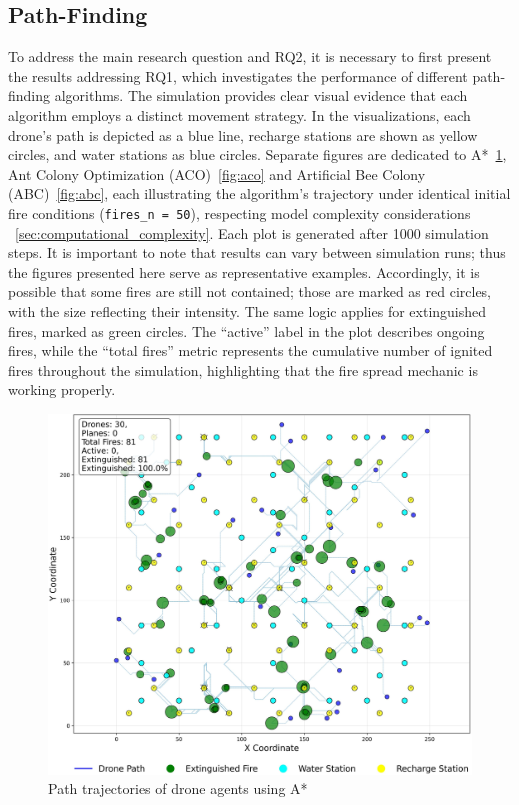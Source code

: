 \documentclass[11pt, a4paper]{article}
\begin{document}
\subsection{Path-Finding}
\label{sec:pathfindingRESULTS}
To address the main research question and RQ2, it is necessary to first present the results addressing RQ1, which investigates the performance of different path-finding algorithms. The simulation provides clear visual evidence that each algorithm employs a distinct movement strategy. In the visualizations, each drone’s path is depicted as a blue line, recharge stations are shown as yellow circles, and water stations as blue circles. Separate figures are dedicated to A*~\ref{fig:a_star}, Ant Colony Optimization (ACO)~\ref{fig:aco} and Artificial Bee Colony (ABC)~\ref{fig:abc}, each illustrating the algorithm’s trajectory under identical initial fire conditions (\texttt{fires\_n = 50}), respecting model complexity considerations ~\ref{sec:computational_complexity}. Each plot is generated after 1000 simulation steps.
It is important to note that results can vary between simulation runs; thus the figures presented here serve as representative examples. Accordingly, it is possible that some fires are still not contained; those are marked as red circles, with the size reflecting their intensity. The same logic applies for extinguished fires, marked as green circles.
The ``active'' label in the plot describes ongoing fires, while the ``total fires'' metric represents the cumulative number of ignited fires throughout the simulation, highlighting that the fire spread mechanic is working properly.

\begin{figure}[htbp]
    \centering
    \includegraphics[width=0.9\linewidth]{figures/A*_agent_paths.jpeg}
    \caption{Path trajectories of drone agents using A*}
    \label{fig:a_star}
\end{figure}
\end{document}
